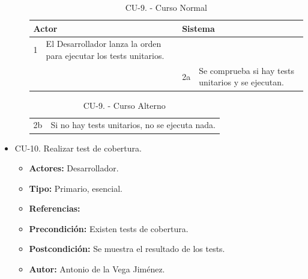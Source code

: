 \begin{itemize}
\begin{itemize}
\begin{table}[H]
\begin{tabularx}{\textwidth}{|l|X|l|X|}
        \multicolumn{2}{|l|}{\cellcolor[HTML]{EFEFEF}Actor} & \multicolumn{2}{l|}{\cellcolor[HTML]{EFEFEF}Sistema} \\ \hline
        1                         & El Desarrollador lanza la orden para ejecutar los tests unitarios.                        &                            &                         \\ \hline
                                  &                         & 2a                          & Se comprueba si hay tests unitarios y se ejecutan.                       \\ \hline

                                  
      \end{tabularx}
      \caption{CU-9. - Curso Normal}
      \label{table-14}
    \end{table}
    \begin{table}[H]
      \centering
      \begin{tabularx}{\textwidth}{|l|X|}
       \hline
       \rowcolor[HTML]{C0C0C0} 
       \multicolumn{2}{|l|}{\cellcolor[HTML]{C0C0C0}Curso Alterno} \\ \hline
       \rowcolor[HTML]{FFFFFF} 
              2b                      & Si no hay tests unitarios, no se ejecuta nada.                            \\ \hline
      \end{tabularx}
      \caption{CU-9. - Curso Alterno}
      \label{table-15}
    \end{table}
  \end{itemize}
  \item CU-10. Realizar test de cobertura.
  \begin{itemize}
    \item \textbf{Actores:} Desarrollador.
    \item \textbf{Tipo:} Primario, esencial.
    \item \textbf{Referencias:}
    \item \textbf{Precondición:} Existen tests de cobertura.
    \item \textbf{Postcondición:} Se muestra el resultado de los tests.
    \item \textbf{Autor:} Antonio de la Vega Jiménez.

\end{itemize}
\end{itemize}

